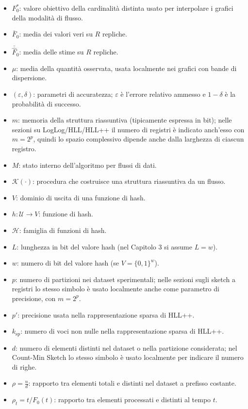 \begin{itemize}
    \item $F_0^{\ast}$: valore obiettivo della cardinalità distinta usato per interpolare i grafici della modalità di flusso.
    \item $\bar{F}_0$: media dei valori veri su $R$ repliche.
    \item $\bar{\hat{F}}_0$: media delle stime su $R$ repliche.
    \item $\mu$: media della quantità osservata, usata localmente nei grafici con bande di dispersione.
    \item $(\varepsilon,\delta)$: parametri di accuratezza; $\varepsilon$ è l'errore relativo ammesso e $1-\delta$ è la probabilità di successo.
    \item $m$: memoria della struttura riassuntiva (tipicamente espressa in bit); nelle sezioni su LogLog/HLL/HLL++ il numero di registri è indicato anch'esso con $m=2^p$, quindi lo spazio complessivo dipende anche dalla larghezza di ciascun registro.
    \item $M$: stato interno dell'algoritmo per flussi di dati.
    \item $\mathcal{K}(\cdot)$: procedura che costruisce una struttura riassuntiva da un flusso.
    \item $V$: dominio di uscita di una funzione di hash.
    \item $h:\mathcal{U}\to V$: funzione di hash.
    \item $\mathcal{H}$: famiglia di funzioni di hash.
    \item $L$: lunghezza in bit del valore hash (nel Capitolo 3 si assume $L=w$).
    \item $w$: numero di bit del valore hash (se $V=\{0,1\}^w$).
    \item $p$: numero di partizioni nei dataset sperimentali; nelle sezioni sugli sketch a registri lo stesso simbolo è usato localmente anche come parametro di precisione, con $m=2^p$.
    \item $p'$: precisione usata nella rappresentazione sparsa di HLL++.
    \item $k_{\text{sp}}$: numero di voci non nulle nella rappresentazione sparsa di HLL++.
    \item $d$: numero di elementi distinti nel dataset o nella partizione considerata; nel Count-Min Sketch lo stesso simbolo è usato localmente per indicare il numero di righe.
    \item $\rho=\frac{n}{d}$: rapporto tra elementi totali e distinti nel dataset a prefisso costante.
    \item $\rho_t=t/F_0(t)$: rapporto tra elementi processati e distinti al tempo $t$.

\end{itemize}
